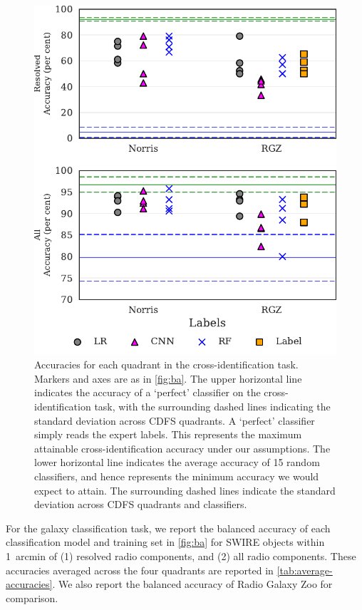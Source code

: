 \documentclass[fleqn,usenatbib,usedcolumn]{mnras}
\begin{document}
    \begin{figure}
      \centering
      \includegraphics[width=\columnwidth]{images/cdfs_cross_identification_grid.pdf}
      \caption{Accuracies for each quadrant in the cross-identification
        task. Markers and axes are as in \autoref{fig:ba}. The upper horizontal line
        indicates the accuracy of a `perfect' classifier on the cross-identification
        task, with the surrounding dashed lines indicating the standard deviation
        across CDFS quadrants. A `perfect' classifier simply reads the expert
        labels. This represents the maximum attainable cross-identification accuracy
        under our assumptions. The lower horizontal line indicates the average
        accuracy of 15 random classifiers, and hence represents the minimum accuracy
        we would expect to attain. The surrounding dashed lines indicate the
        standard deviation across CDFS quadrants and classifiers.
        \label{fig:cross-id-accuracy}}
    \end{figure}

    For the galaxy classification task, we report the balanced accuracy of
    each classification model and training set in \autoref{fig:ba} for SWIRE
    objects within 1~arcmin of (1) resolved radio components, and (2) all
    radio components. These accuracies averaged across the four quadrants are
    reported in \autoref{tab:average-accuracies}. We also report the balanced
    accuracy of Radio Galaxy Zoo for comparison.
\end{document}
